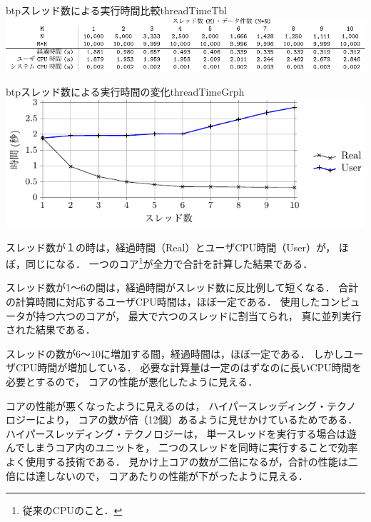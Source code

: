 \begin{mytable}{btp}{スレッド数による実行時間比較}{threadTimeTbl}
\includegraphics[scale=1.0]{Tbl/threadTimeTbl.pdf}
\end{mytable}

\begin{myfig}{btp}{スレッド数による実行時間の変化}{threadTimeGrph}
\includegraphics[scale=1.0]{Tbl/threadTimeGrph.pdf}
\end{myfig}

スレッド数が１の時は，経過時間（Real）とユーザCPU時間（User）が，
ほぼ，同じになる．
一つのコア\footnote{従来のCPUのこと．}が全力で合計を計算した結果である．

スレッド数が1〜6の間は，経過時間がスレッド数に反比例して短くなる．
合計の計算時間に対応するユーザCPU時間は，ほぼ一定である．
使用したコンピュータが持つ六つのコアが，
最大で六つのスレッドに割当てられ，
真に並列実行された結果である．

スレッドの数が6〜10に増加する間，経過時間は，ほぼ一定である．
しかしユーザCPU時間が増加している．
必要な計算量は一定のはずなのに長いCPU時間を必要とするので，
コアの性能が悪化したように見える．

コアの性能が悪くなったように見えるのは，
ハイパースレッディング・テクノロジー\cite{hyperThreading}により，
コアの数が倍（12個）あるように見せかけているためである．
ハイパースレッディング・テクノロジーは，
単一スレッドを実行する場合は遊んでしまうコア内のユニットを，
二つのスレッドを同時に実行することで効率よく使用する技術である．
見かけ上コアの数が二倍になるが，合計の性能は二倍には達しないので，
コアあたりの性能が下がったように見える．


